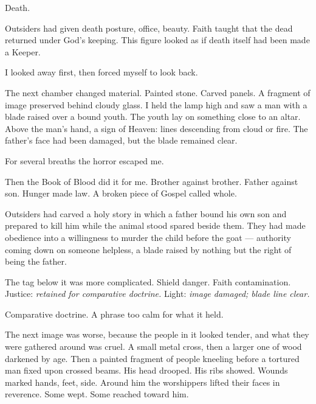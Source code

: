 Death.\par

Outsiders had given death posture, office, beauty. Faith taught that the dead returned under God's keeping. This figure looked as if death itself had been made a Keeper.\par

I looked away first, then forced myself to look back.\par

The next chamber changed material. Painted stone. Carved panels. A fragment of image preserved behind cloudy glass. I held the lamp high and saw a man with a blade raised over a bound youth. The youth lay on something close to an altar. Above the man's hand, a sign of Heaven: lines descending from cloud or fire. The father's face had been damaged, but the blade remained clear.\par

For several breaths the horror escaped me.\par

Then the Book of Blood did it for me. Brother against brother. Father against son. Hunger made law. A broken piece of Gospel called whole.\par

Outsiders had carved a holy story in which a father bound his own son and prepared to kill him while the animal stood spared beside them. They had made obedience into a willingness to murder the child before the goat --- authority coming down on someone helpless, a blade raised by nothing but the right of being the father.\par

The tag below it was more complicated. Shield danger. Faith contamination. Justice: \textit{retained for comparative doctrine.} Light: \textit{image damaged; blade line clear.}\par

Comparative doctrine. A phrase too calm for what it held.\par

The next image was worse, because the people in it looked tender, and what they were gathered around was cruel. A small metal cross, then a larger one of wood darkened by age. Then a painted fragment of people kneeling before a tortured man fixed upon crossed beams. His head drooped. His ribs showed. Wounds marked hands, feet, side. Around him the worshippers lifted their faces in reverence. Some wept. Some reached toward him.\par

